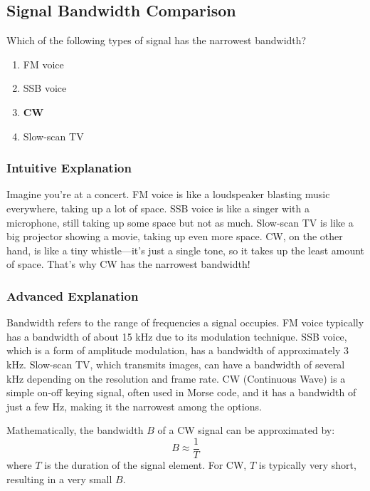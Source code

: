 \subsection{Signal Bandwidth Comparison}
\label{T8A05}

\begin{tcolorbox}[colback=gray!10!white,colframe=black!75!black,title=T8A05]
Which of the following types of signal has the narrowest bandwidth?
\begin{enumerate}[label=\Alph*)]
    \item FM voice
    \item SSB voice
    \item \textbf{CW}
    \item Slow-scan TV
\end{enumerate}
\end{tcolorbox}

\subsubsection{Intuitive Explanation}
Imagine you're at a concert. FM voice is like a loudspeaker blasting music everywhere, taking up a lot of space. SSB voice is like a singer with a microphone, still taking up some space but not as much. Slow-scan TV is like a big projector showing a movie, taking up even more space. CW, on the other hand, is like a tiny whistle—it’s just a single tone, so it takes up the least amount of space. That’s why CW has the narrowest bandwidth!

\subsubsection{Advanced Explanation}
Bandwidth refers to the range of frequencies a signal occupies. FM voice typically has a bandwidth of about 15 kHz due to its modulation technique. SSB voice, which is a form of amplitude modulation, has a bandwidth of approximately 3 kHz. Slow-scan TV, which transmits images, can have a bandwidth of several kHz depending on the resolution and frame rate. CW (Continuous Wave) is a simple on-off keying signal, often used in Morse code, and it has a bandwidth of just a few Hz, making it the narrowest among the options.

Mathematically, the bandwidth \( B \) of a CW signal can be approximated by:
\[ B \approx \frac{1}{T} \]
where \( T \) is the duration of the signal element. For CW, \( T \) is typically very short, resulting in a very small \( B \).

